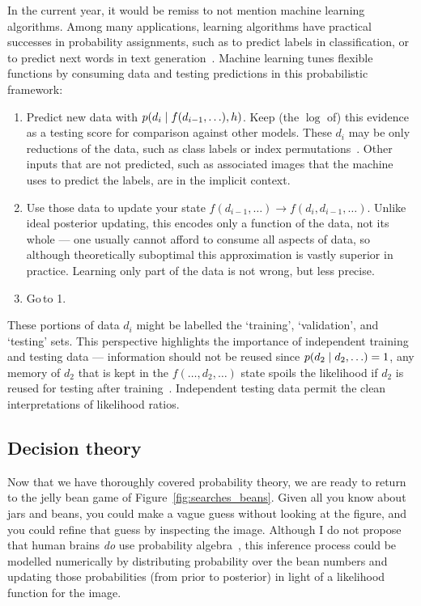 In the current year, it would be remiss to not mention machine learning
algorithms.
Among many applications, learning algorithms have practical successes in
probability assignments, such as to predict labels in classification,
or to predict next words in text generation~\cite{
MurphyKevinP.2012Mlap,
radford2019language
}.
Machine learning tunes flexible functions by consuming data and testing
predictions in this probabilistic framework:
\begin{enumerate}
\item Predict new data with $p(d_i \mid f(d_{i-1}, \ldots), h)$.
Keep (the $\log$ of) this evidence as a testing score for comparison against
other models.
These $d_i$ may be only reductions of the data, such as class labels
or index permutations~\cite{Noroozi2016jigsaw, multitaskself2017}.
Other inputs that are not predicted, such as associated images that the machine
uses to predict the labels, are in the implicit context.
\item Use those data to update your state
$f(d_{i-1}, \ldots) \to f(d_i, d_{i-1}, \ldots)$.
Unlike ideal posterior updating, this encodes only a function of the data, not
its whole --- one usually cannot afford to consume all aspects of data, so
although theoretically suboptimal this approximation is vastly superior in
practice.
Learning only part of the data is not wrong, but less precise.
\item Go\,to 1.
\end{enumerate}
These portions of data $d_i$ might be labelled the `training', `validation',
and `testing' sets.
This perspective highlights the importance of independent training and testing
data --- information should not be reused since
$p(d_2 \mid d_2, \ldots) = 1$, any memory of $d_2$ that is kept
in the $f(\ldots, d_2, \ldots)$ state spoils the likelihood if $d_2$ is reused
for testing after training~\cite{sivia2006data}.
Independent testing data permit the clean interpretations of likelihood ratios.


\subsection{Decision theory}
Now that we have thoroughly covered probability theory, we are ready to return
to the jelly bean game of Figure~\ref{fig:searches_beans}.
Given all you know about jars and beans, you could make a vague guess without
looking at the figure, and you could refine that guess by inspecting the image.
Although I do not propose that human brains \emph{do} use probability
algebra~\cite{jaynes1988brain}, this inference process could be modelled
numerically by distributing probability over the bean numbers
and updating those probabilities (from prior to posterior) in light of a
likelihood function for the image.

